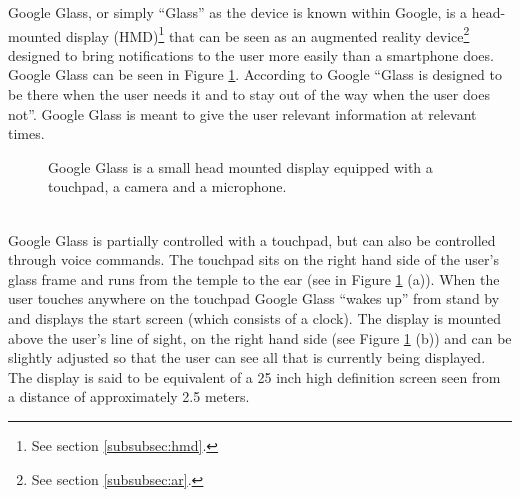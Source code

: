 Google Glass, or simply ``Glass'' as the device is known within Google, is a head-mounted display (HMD)\footnote{See section \ref{subsubsec:hmd}.} that can be seen as an augmented reality device\footnote{See section \ref{subsubsec:ar}.} designed to bring notifications to the user more easily than a smartphone does. Google Glass can be seen in Figure \ref{GoogleGlassHardware}. According to Google ``Glass is designed to be there when the user needs it and to stay out of the way when the user does not''.\cite{glassDesignPrinciples} Google Glass is meant to give the user relevant information at relevant times.
\\
	\begin{figure}[ht!]
		\centering
    \qquad
    \qquad
		\caption{Google Glass is a small head mounted display equipped with a touchpad, a camera and a microphone.\cite{ImagesGoogleGlassUI}}
		\label{GoogleGlassHardware}
	\end{figure}
\\
Google Glass is partially controlled with a touchpad, but can also be controlled through voice commands. The touchpad sits on the right hand side of the user's glass frame and runs from the temple to the ear (see in Figure \ref{GoogleGlassHardware} (a)). When the user touches anywhere on the touchpad Google Glass ``wakes up'' from stand by and displays the start screen (which consists of a clock). The display is mounted above the user's line of sight, on the right hand side (see Figure \ref{GoogleGlassHardware} (b)) and can be slightly adjusted so that the user can see all that is currently being displayed. The display is said to be equivalent of a 25 inch high definition screen seen from a distance of approximately 2.5 meters.\cite{GlassSpecs}

